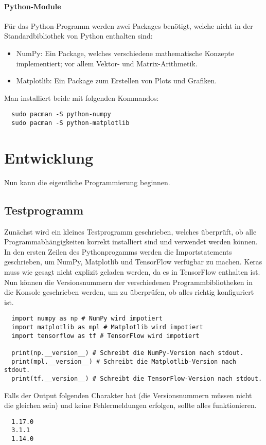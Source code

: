 \paragraph{Python-Module}

Für das Python-Programm werden zwei Packages benötigt, welche
nicht in der Standardbibliothek von Python enthalten sind:
\begin{itemize}
\item{NumPy: Ein Package, welches verschiedene mathematische Konzepte
    implementiert; vor allem Vektor- und Matrix-Arithmetik.}
\item{Matplotlib: Ein Package zum Erstellen von Plots und Grafiken.}
\end{itemize}

Man installiert beide mit folgenden Kommandos:
\begin{verbatim}
  sudo pacman -S python-numpy
  sudo pacman -S python-matplotlib
\end{verbatim}

\section{Entwicklung}
Nun kann die eigentliche Programmierung beginnen.

\subsection{Testprogramm}
Zunächst wird ein kleines Testprogramm geschrieben, welches überprüft, ob
alle Programmabhängigkeiten korrekt installiert sind und verwendet werden können.
In den ersten Zeilen des Pythonprogamms werden die Importstatements
geschrieben, um NumPy, Matplotlib und TensorFlow verfügbar zu machen.
Keras muss wie gesagt nicht explizit geladen werden, da es in TensorFlow
enthalten ist.
Nun können die Versionsnummern der verschiedenen Programmbibliotheken
in die Konsole geschrieben werden, um zu überprüfen, ob alles richtig konfiguriert ist.
\begin{verbatim}
  import numpy as np # NumPy wird impotiert
  import matplotlib as mpl # Matplotlib wird impotiert
  import tensorflow as tf # TensorFlow wird impotiert

  print(np.__version__) # Schreibt die NumPy-Version nach stdout.
  print(mpl.__version__) # Schreibt die Matplotlib-Version nach stdout.
  print(tf.__version__) # Schreibt die TensorFlow-Version nach stdout.
\end{verbatim}
Falls der Output folgenden Charakter hat (die Versionsnummern müssen nicht
die gleichen sein) und keine Fehlermeldungen erfolgen, sollte alles funktionieren.
\begin{verbatim}
  1.17.0
  3.1.1
  1.14.0
\end{verbatim}
\para{}

